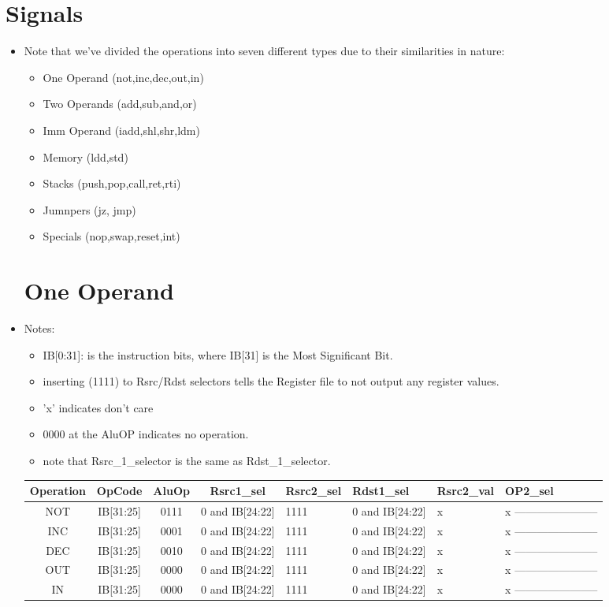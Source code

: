 \documentclass[12pt]{report}
\begin{document}
\section{Signals}

\begin{itemize}
    \item Note that we've divided the operations into seven different types due to their similarities in nature:
    \begin{itemize}
        \item One Operand (not,inc,dec,out,in)
        \item Two Operands (add,sub,and,or)
        \item Imm Operand (iadd,shl,shr,ldm)
        \item Memory (ldd,std)
        \item Stacks (push,pop,call,ret,rti)
        \item Jumnpers (jz, jmp)
        \item Specials (nop,swap,reset,int)
    \end{itemize}
    \section{One Operand}
        \item Notes:
        \begin{itemize}
            \item IB[0:31]: is the instruction bits, where IB[31] is the Most Significant Bit.
            \item inserting (1111) to Rsrc/Rdst selectors tells the Register file to not output any register values.
            \item 'x' indicates don't care
            \item 0000 at the AluOP indicates no operation.
            \item note that Rsrc_1_selector is the same as Rdst_1_selector.
        \end{itemize}

        \begin{center}
        \begin{tabular}{||c| c| c| c| p{40mm}||} 
        \hline
        Operation & OpCode & AluOp & Rsrc1_sel & Rsrc2_sel & Rdst1_sel & Rsrc2_val & OP2_sel  \\ [0.5ex] 
        \hline\hline
        NOT & IB[31:25] & 0111 & 0 and IB[24:22] & 1111 & 0 and IB[24:22] & x & x ----------------------- \\
        INC & IB[31:25] & 0001 & 0 and IB[24:22] & 1111 & 0 and IB[24:22] & x & x  ----------------------- \\
        DEC & IB[31:25] & 0010 & 0 and IB[24:22] & 1111 & 0 and IB[24:22] & x & x ----------------------- \\
        OUT & IB[31:25] & 0000 & 0 and IB[24:22] & 1111 & 0 and IB[24:22] & x & x ----------------------- \\
        IN  & IB[31:25] & 0000 & 0 and IB[24:22] & 1111 & 0 and IB[24:22] & x & x ----------------------- \\
        \hline


\end{tabular}
\end{center}
\end{itemize}
\end{document}
